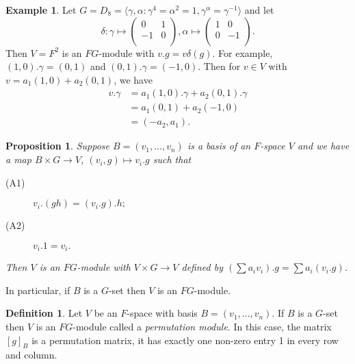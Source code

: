 \documentclass[12pt]{amsart}
\newtheorem{proposition}[theorem]{Proposition}
\theoremstyle{definition}
\newtheorem{example}[theorem]{Example}
\newtheorem{definition}[theorem]{Definition}
\begin{document}
\begin{example}
Let $G=D_8=\langle\gamma,\alpha:\gamma^4=\alpha^2=1,\gamma^{\alpha}=\gamma^{-1}\rangle$ and let
$$\delta:\gamma\mapsto\left(\begin{array}{cc}
0 & 1 \\ -1 & 0 \\
\end{array}\right),
\alpha\mapsto\left(\begin{array}{cc}
1 & 0 \\ 0 & -1 \\
\end{array}\right).$$
Then $V=F^2$ is an $FG$-module with $v.g=v\delta(g).$  For example, $(1,0).\gamma=(0,1)$ and $(0,1).\gamma=(-1,0)$.  Then for $v\in V$ with $v=a_1(1,0)+a_2(0,1)$, we have
\begin{equation*}
\begin{split}
v.\gamma &= a_1(1,0).\gamma+a_2(0,1).\gamma\\
&= a_1(0,1)+a_2(-1,0)\\
&= (-a_2,a_1).
\end{split}
\end{equation*}
\end{example}

\begin{proposition}
Suppose $B=(v_1,\ldots,v_n)$ is a basis of an $F$-space $V$ and we have a map $B\times G\rightarrow V$, $(v_i, g)\mapsto v_i.g$ such that
\begin{description}
\item[(A1)] $v_i.(gh)=(v_i.g).h;$
\item[(A2)] $v_i.1=v_i.$
\end{description}
Then $V$ is an $FG$-module with $V\times G\rightarrow V$ defined by $(\sum a_i v_i).g=\sum a_i(v_i.g)$.
\end{proposition}

\noindent In particular, if $B$ is a $G$-set then $V$ is an $FG$-module.

\begin{definition}
Let $V$ be an $F$-space with basis $B=(v_1,\ldots,v_n)$.  If $B$ is a $G$-set then $V$ is an $FG$-module called a \emph{permutation module}.  In this case, the matrix $[g]_B$ is a permutation matrix, it has exactly one non-zero entry 1 in every row and column.
\end{definition}
\end{document}
